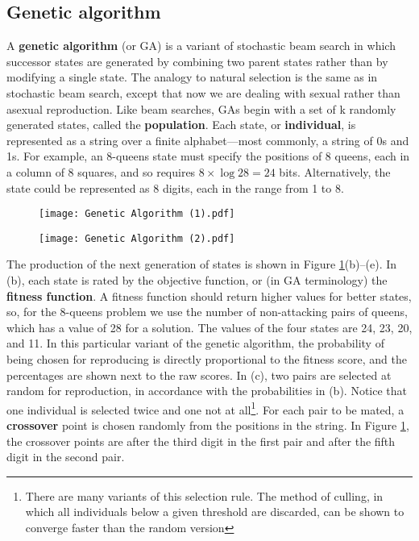 \subsection{Genetic algorithm}
A \textbf{genetic algorithm} (or GA) is a variant of stochastic beam search in which successor states are generated by combining two parent states rather than by modifying a single state. The analogy to natural selection is the same as in stochastic beam search, except that now we are dealing with sexual rather than asexual reproduction.
Like beam searches, GAs begin with a set of k randomly generated states, called the \textbf{population}. Each state, or \textbf{individual}, is represented as a string over a finite alphabet—most commonly, a string of 0s and 1s. For example, an 8-queens state must specify the positions of 8 queens, each in a column of 8 squares, and so requires $8\times \log{2 8}=24$ bits. Alternatively, the state could be represented as 8 digits, each in the range from 1 to 8.
\begin{figure}[h!]
\centering
{\texttt{[image: Genetic Algorithm (1).pdf]}}
\caption{}
\label{fig:geneticalgorithm1}
\end{figure}

\begin{figure}[h!]
\centering
{\texttt{[image: Genetic Algorithm (2).pdf]}}
\caption{}
\label{fig:geneticalgorithm2}
\end{figure}
The production of the next generation of states is shown in Figure \ref{fig:geneticalgorithm1}(b)–(e). In (b), each state is rated by the objective function, or (in GA terminology) the \textbf{fitness function}. A fitness function should return higher values for better states, so, for the 8-queens problem we use the number of non-attacking pairs of queens, which has a value of 28 for a solution.
The values of the four states are 24, 23, 20, and 11. In this particular variant of the genetic algorithm, the probability of being chosen for reproducing is directly proportional to the fitness score, and the percentages are shown next to the raw scores.
In (c), two pairs are selected at random for reproduction, in accordance with the probabilities in (b). Notice that one individual is selected twice and one not at all\footnote{There are many variants of this selection rule. The method of culling, in which all individuals below a given threshold are discarded, can be shown to converge faster than the random version}. 
For each pair to be mated, a \textbf{crossover} point is chosen randomly from the positions in the string. In Figure \ref{fig:geneticalgorithm1}, the crossover points are after the third digit in the first pair and after the fifth digit in the second pair.

